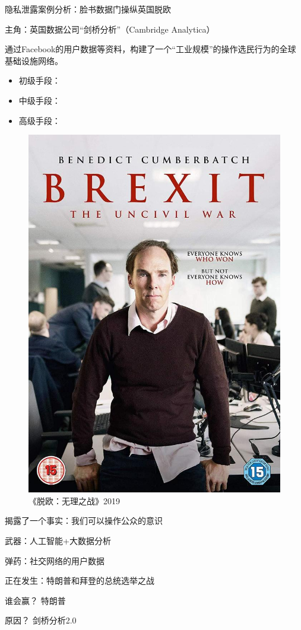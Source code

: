 \documentclass[11pt]{beamer}
\begin{document}
\begin{frame}[allowframebreaks]{隐私泄露案例分析：脸书数据门操纵英国脱欧}
	
	\begin{minipage}[t]{0.7\linewidth}

主角：英国数据公司“剑桥分析”（Cambridge Analytica）

通过Facebook的用户数据等资料，构建了一个“工业规模”的操作选民行为的全球基础设施网络。

\begin{itemize}
	\item 初级手段：
	\item 中级手段：
	\item 高级手段：
\end{itemize}

\end{minipage}%
	\begin{minipage}[t]{0.3\linewidth}
		\begin{figure}
			\centering
			\includegraphics[width=0.7\linewidth]{figures/privacy/brexit.jpeg}
			\caption{《脱欧：无理之战》2019}
		\end{figure}
	\end{minipage}%

\newpage

揭露了一个事实：我们可以操作公众的意识

武器：人工智能+大数据分析

弹药：社交网络的用户数据

正在发生：特朗普和拜登的总统选举之战

谁会赢？ 特朗普

原因？ 剑桥分析2.0
\end{frame}
\end{document}
